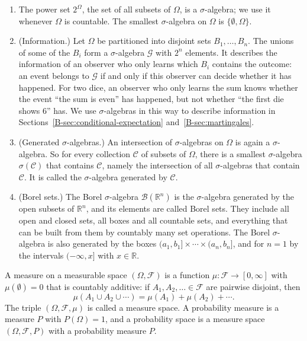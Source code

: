 \begin{example}\label{B-ex:sigma-algebras}
    \begin{enumerate}
        \item The power set $2^\Omega$, the set of all subsets of $\Omega$, is a $\sigma$-algebra; we use it whenever $\Omega$ is countable. The smallest $\sigma$-algebra on $\Omega$ is $\{\emptyset, \Omega\}$.
        \item (Information.) Let $\Omega$ be partitioned into disjoint sets $B_1, \ldots, B_n$. The unions of some of the $B_i$ form a $\sigma$-algebra $\mathcal{G}$ with $2^n$ elements. It describes the information of an observer who only learns which $B_i$ contains the outcome: an event belongs to $\mathcal{G}$ if and only if this observer can decide whether it has happened. For two dice, an observer who only learns the sum knows whether the event ``the sum is even'' has happened, but not whether ``the first die shows $6$'' has. We use $\sigma$-algebras in this way to describe information in Sections~\ref{B-sec:conditional-expectation} and~\ref{B-sec:martingales}.
        \item (Generated $\sigma$-algebras.) An intersection of $\sigma$-algebras on $\Omega$ is again a $\sigma$-algebra. So for every collection $\mathcal{C}$ of subsets of $\Omega$, there is a smallest $\sigma$-algebra $\sigma(\mathcal{C})$ that contains $\mathcal{C}$, namely the intersection of all $\sigma$-algebras that contain $\mathcal{C}$. It is called the $\sigma$-algebra generated by $\mathcal{C}$.
        \item (Borel sets.) The Borel $\sigma$-algebra $\mathcal{B}(\mathbb{R}^n)$ is the $\sigma$-algebra generated by the open subsets of $\mathbb{R}^n$, and its elements are called Borel sets. They include all open and closed sets, all boxes and all countable sets, and everything that can be built from them by countably many set operations. The Borel $\sigma$-algebra is also generated by the boxes $(a_1, b_1] \times \cdots \times (a_n, b_n]$, and for $n = 1$ by the intervals $(-\infty, x]$ with $x \in \mathbb{R}$.
    \end{enumerate}
\end{example}

\begin{definition}\label{B-def:measure}
    A measure on a measurable space $(\Omega, \mathcal{F})$ is a function $\mu: \mathcal{F} \to [0, \infty]$ with $\mu(\emptyset) = 0$ that is countably additive: if $A_1, A_2, \ldots \in \mathcal{F}$ are pairwise disjoint, then
    \[\mu(A_1 \cup A_2 \cup \cdots) = \mu(A_1) + \mu(A_2) + \cdots.\]
    The triple $(\Omega, \mathcal{F}, \mu)$ is called a measure space. A probability measure is a measure $P$ with $P(\Omega) = 1$, and a probability space is a measure space $(\Omega, \mathcal{F}, P)$ with a probability measure $P$.
\end{definition}

